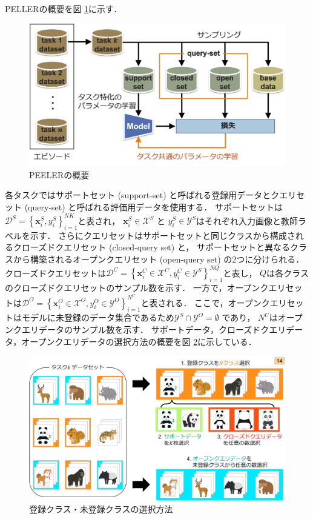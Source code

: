 \documentclass[a4paper,11pt,nomag]{jsreport}
\begin{document}
PELLERの概要を図 \ref{fig:peeler}に示す．
% 
\begin{figure}[tbp]
  \centering
  \includegraphics[width=\linewidth, keepaspectratio]{image/peeler.png}
  \caption{PEELERの概要}
  \label{fig:peeler}
\end{figure}
% 
各タスクではサポートセット (support-set) と呼ばれる登録用データとクエリセット (query-set) と呼ばれる評価用データを使用する．
サポートセットは$\mathcal{D}^S = \left\{ \bm{x}^S_i, y^S_i \right\}^{NK}_{i=1}$と表され，
$\bm{x}^S_i \in \mathcal{X}^S$ と $y^S_i \in \mathcal{Y}^S$はそれぞれ入力画像と教師ラベルを示す．
さらにクエリセットはサポートセットと同じクラスから構成されるクローズドクエリセット (closed-query set) と，
サポートセットと異なるクラスから構築されるオープンクエリセット (open-query set) の2つに分けられる．
クローズドクエリセットは$\mathcal{D}^C = \left\{ \bm{x}^C_i \in \mathcal{X}^C, y^C_i \in \mathcal{Y}^S \right\}^{NQ}_{i=1}$と表し，
$Q$は各クラスのクローズドクエリセットのサンプル数を示す．
一方で，オープンクエリセットは$\mathcal{D}^O = \left\{ \bm{x}^O_i \in \mathcal{X}^O, y^O_i \in \mathcal{Y}^O \right\}^{N^U}_{i=1}$と表される．
ここで，オープンクエリセットはモデルに未登録のデータ集合であるため$\mathcal{Y}^S \cap \mathcal{Y}^O = \emptyset$ であり， $N^U$はオープンクエリデータのサンプル数を示す．
サポートデータ，クローズドクエリデータ，オープンクエリデータの選択方法の概要を図 \ref{fig:peeler_data}に示している．
% 
\begin{figure}[tbp]
  \centering
  \includegraphics[width=\linewidth, keepaspectratio]{image/meta-class.png}
  \caption{登録クラス・未登録クラスの選択方法}
  \label{fig:peeler_data}
\end{figure}
\end{document}
